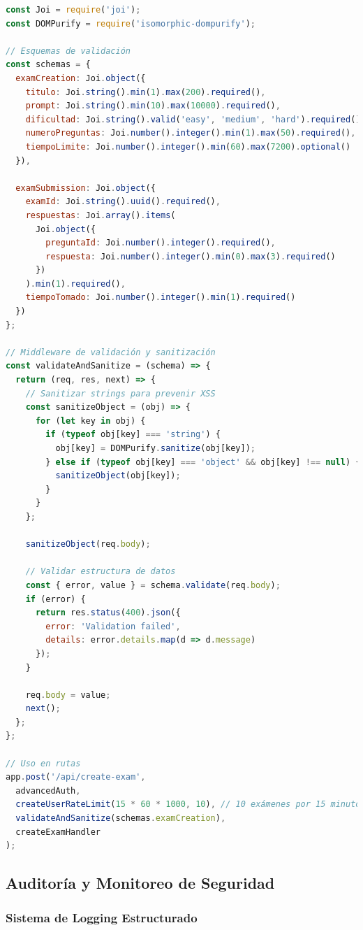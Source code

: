 \documentclass[12pt,a4paper]{report}
\begin{document}
\begin{lstlisting}[language=JavaScript, caption=Sistema de validación y sanitización robusto]
const Joi = require('joi');
const DOMPurify = require('isomorphic-dompurify');

// Esquemas de validación
const schemas = {
  examCreation: Joi.object({
    titulo: Joi.string().min(1).max(200).required(),
    prompt: Joi.string().min(10).max(10000).required(),
    dificultad: Joi.string().valid('easy', 'medium', 'hard').required(),
    numeroPreguntas: Joi.number().integer().min(1).max(50).required(),
    tiempoLimite: Joi.number().integer().min(60).max(7200).optional()
  }),
  
  examSubmission: Joi.object({
    examId: Joi.string().uuid().required(),
    respuestas: Joi.array().items(
      Joi.object({
        preguntaId: Joi.number().integer().required(),
        respuesta: Joi.number().integer().min(0).max(3).required()
      })
    ).min(1).required(),
    tiempoTomado: Joi.number().integer().min(1).required()
  })
};

// Middleware de validación y sanitización
const validateAndSanitize = (schema) => {
  return (req, res, next) => {
    // Sanitizar strings para prevenir XSS
    const sanitizeObject = (obj) => {
      for (let key in obj) {
        if (typeof obj[key] === 'string') {
          obj[key] = DOMPurify.sanitize(obj[key]);
        } else if (typeof obj[key] === 'object' && obj[key] !== null) {
          sanitizeObject(obj[key]);
        }
      }
    };
    
    sanitizeObject(req.body);
    
    // Validar estructura de datos
    const { error, value } = schema.validate(req.body);
    if (error) {
      return res.status(400).json({
        error: 'Validation failed',
        details: error.details.map(d => d.message)
      });
    }
    
    req.body = value;
    next();
  };
};

// Uso en rutas
app.post('/api/create-exam', 
  advancedAuth,
  createUserRateLimit(15 * 60 * 1000, 10), // 10 exámenes por 15 minutos
  validateAndSanitize(schemas.examCreation),
  createExamHandler
);
\end{lstlisting}

\subsection{Auditoría y Monitoreo de Seguridad}

\subsubsection{Sistema de Logging Estructurado}
\end{document}
